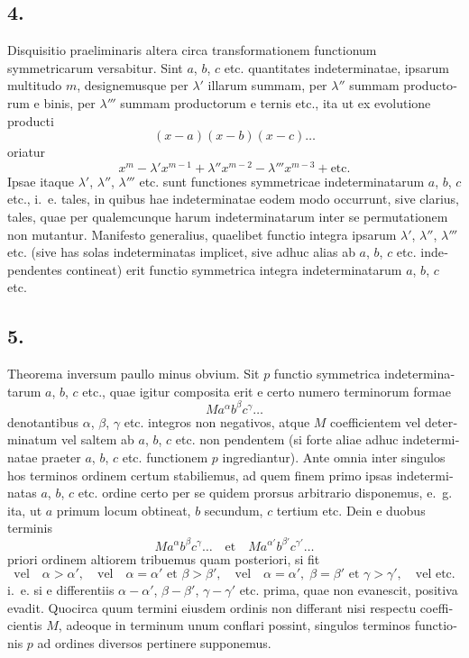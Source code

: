 \documentclass[12pt,a4paper]{article}
\begin{document}
\begin{otherlanguage}{latin}
\subsection*{4.}
Disquisitio praeliminaris altera circa transformationem functionum symmetricarum versabitur. Sint $a$, $b$, $c$ etc. quantitates indeterminatae, ipsarum multitudo $m$, designemusque per $\lambda'$ illarum summam, per $\lambda''$ summam productorum e binis, per $\lambda'''$ summam productorum e ternis etc., ita ut ex evolutione producti
\[(x-a)(x-b)(x-c)\ldots\]
oriatur
\[x^{m}-\lambda'x^{m-1}+\lambda''x^{m-2}-\lambda'''x^{m-3}+\text{etc.}\]
Ipsae itaque $\lambda'$, $\lambda''$, $\lambda'''$ etc. sunt functiones symmetricae indeterminatarum $a$, $b$, $c$ etc., i.~e. tales, in quibus hae indeterminatae eodem modo occurrunt, sive clarius, tales, quae per qualemcunque harum indeterminatarum inter se permutationem non mutantur. Manifesto generalius, quaelibet functio integra ipsarum $\lambda'$, $\lambda''$, $\lambda'''$ etc. (sive has solas indeterminatas implicet, sive adhuc alias ab $a$, $b$, $c$ etc. independentes contineat) erit functio symmetrica integra indeterminatarum $a$, $b$, $c$ etc.

\subsection*{5.}
Theorema inversum paullo minus obvium. Sit $p$ functio symmetrica indeterminatarum $a$, $b$, $c$ etc., quae igitur composita erit e certo numero terminorum formae
\[Ma^{\alpha}b^{\beta}c^{\gamma}\ldots\]
denotantibus $\alpha$, $\beta$, $\gamma$ etc. integros non negativos, atque $M$ coefficientem vel determinatum vel saltem ab $a$, $b$, $c$ etc. non pendentem (si forte aliae adhuc indeterminatae praeter $a$, $b$, $c$ etc. functionem $p$ ingrediantur). Ante omnia inter singulos hos terminos ordinem certum stabiliemus, ad quem finem primo ipsas indeterminatas $a$, $b$, $c$ etc. ordine certo per se quidem prorsus arbitrario disponemus, e.~g. ita, ut $a$ primum locum obtineat, $b$ secundum, $c$ tertium etc. Dein e duobus terminis
\[Ma^{\alpha}b^{\beta}c^{\gamma}\ldots\quad\text{et}\quad Ma^{\alpha'}b^{\beta'}c^{\gamma'}\ldots\]
priori ordinem altiorem tribuemus quam posteriori, si fit
\[\text{vel}\quad\alpha>\alpha',\quad\text{vel}\quad\alpha=\alpha'\text{ et }\beta>\beta',\quad\text{vel}\quad\alpha=\alpha',\;\beta=\beta'\text{ et }\gamma>\gamma',\quad\text{vel etc.}\]
i.~e. si e differentiis $\alpha-\alpha'$, $\beta-\beta'$, $\gamma-\gamma'$ etc. prima, quae non evanescit, positiva evadit. Quocirca quum termini eiusdem ordinis non differant nisi respectu coefficientis $M$, adeoque in terminum unum conflari possint, singulos terminos functionis $p$ ad ordines diversos pertinere supponemus.


\end{otherlanguage}
\end{document}

